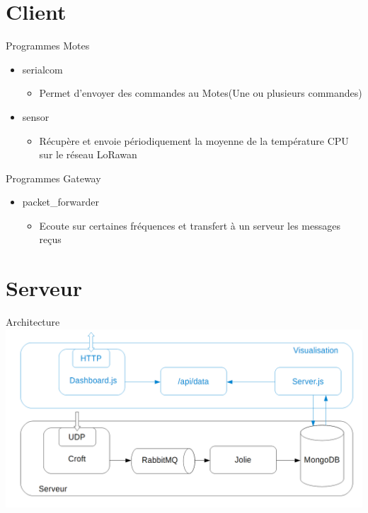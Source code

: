 \documentclass{beamer}
\begin{document}
\section{Client}
\begin{frame}
	\begin{block}{Programmes Motes}
		\begin{itemize}
			\item serialcom
				\begin{itemize}
					\item Permet d'envoyer des commandes au Motes(Une ou plusieurs commandes)
				\end{itemize}
			\item sensor
				\begin{itemize}
					\item Récupère et envoie périodiquement la moyenne de la température CPU sur le réseau LoRawan
				\end{itemize}
		\end{itemize}
	\end{block}
\end{frame}

\begin{frame}
	\begin{block}{Programmes Gateway}
		\begin{itemize}
			\item packet\_forwarder
			\begin{itemize}
				\item Ecoute sur certaines fréquences et transfert à un serveur les messages reçus
			\end{itemize}
		\end{itemize}
	\end{block}
\end{frame}

\section{Serveur}
\begin{frame}{Architecture}
	\includegraphics[scale=0.3]{M2M.png}
\end{frame}
\end{document}
